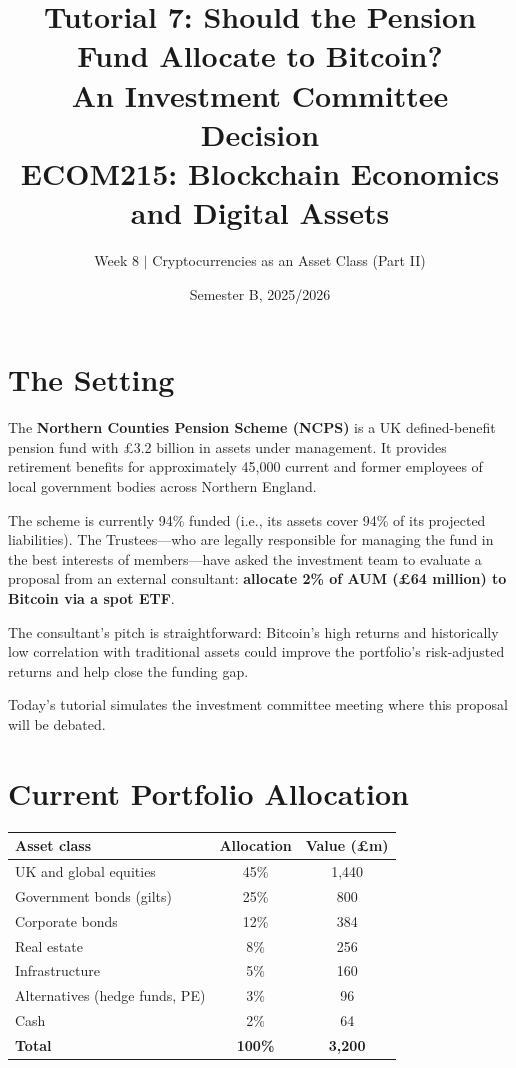 \documentclass[11pt]{article}
\title{Tutorial 7: Should the Pension Fund Allocate to Bitcoin?\\[0.3em] \Large An Investment Committee Decision\\[1em] \normalsize ECOM215: Blockchain Economics and Digital Assets}
\author{Week 8 $\vert$ Cryptocurrencies as an Asset Class (Part II)}
\date{Semester B, 2025/2026}
\begin{document}
\maketitle

\vspace{1em}
\begin{center}
\end{center}

\section*{The Setting}

The \textbf{Northern Counties Pension Scheme (NCPS)} is a UK defined-benefit pension fund with \pounds 3.2 billion in assets under management. It provides retirement benefits for approximately 45,000 current and former employees of local government bodies across Northern England.

The scheme is currently 94\% funded (i.e., its assets cover 94\% of its projected liabilities). The Trustees---who are legally responsible for managing the fund in the best interests of members---have asked the investment team to evaluate a proposal from an external consultant: \textbf{allocate 2\% of AUM (\pounds 64 million) to Bitcoin via a spot ETF}.

The consultant's pitch is straightforward: Bitcoin's high returns and historically low correlation with traditional assets could improve the portfolio's risk-adjusted returns and help close the funding gap.

Today's tutorial simulates the investment committee meeting where this proposal will be debated.

\section*{Current Portfolio Allocation}

\begin{center}
\begin{tabular}{lcc}
\toprule
\textbf{Asset class} & \textbf{Allocation} & \textbf{Value (\pounds m)} \\
\midrule
UK and global equities & 45\% & 1,440 \\
Government bonds (gilts) & 25\% & 800 \\
Corporate bonds & 12\% & 384 \\
Real estate & 8\% & 256 \\
Infrastructure & 5\% & 160 \\
Alternatives (hedge funds, PE) & 3\% & 96 \\
Cash & 2\% & 64 \\
\midrule
\textbf{Total} & \textbf{100\%} & \textbf{3,200} \\
\bottomrule
\end{tabular}
\end{center}
\end{document}
